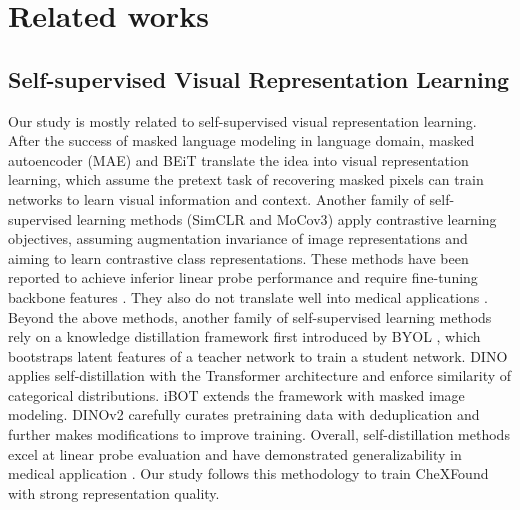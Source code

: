 \section{Related works}
\subsection{Self-supervised Visual Representation Learning}
Our study is mostly related to self-supervised visual representation learning. After the success of masked language modeling in language domain, masked autoencoder (MAE) \cite{he2022masked} and BEiT \cite{bao2021beit} translate the idea into visual representation learning, which assume the pretext task of recovering masked pixels can train networks to learn visual information and context. Another family of self-supervised learning methods (SimCLR \cite{chen2020simple} and MoCov3\cite{chen2021empirical}) apply contrastive learning objectives, assuming augmentation invariance of image representations and aiming to learn contrastive class representations. These methods have been reported to achieve inferior linear probe performance and require fine-tuning backbone features \cite{oquab2023dinov2}. They also do not translate well into medical applications \cite{chen2024towards}. Beyond the above methods, another family of self-supervised learning methods rely on a knowledge distillation framework first introduced by BYOL \cite{grill2020bootstrap}, which bootstraps latent features of a teacher network to train a student network. DINO \cite{caron2021emerging} applies self-distillation with the Transformer architecture and enforce similarity of categorical distributions. iBOT \cite{zhou2021ibot} extends the framework with masked image modeling. DINOv2 \cite{oquab2023dinov2} carefully curates pretraining data with deduplication and further makes modifications to improve training. Overall, self-distillation methods excel at linear probe evaluation and have demonstrated generalizability in medical application \cite{perez2024rad, chen2024towards}. Our study follows this methodology to train CheXFound with strong representation quality.

